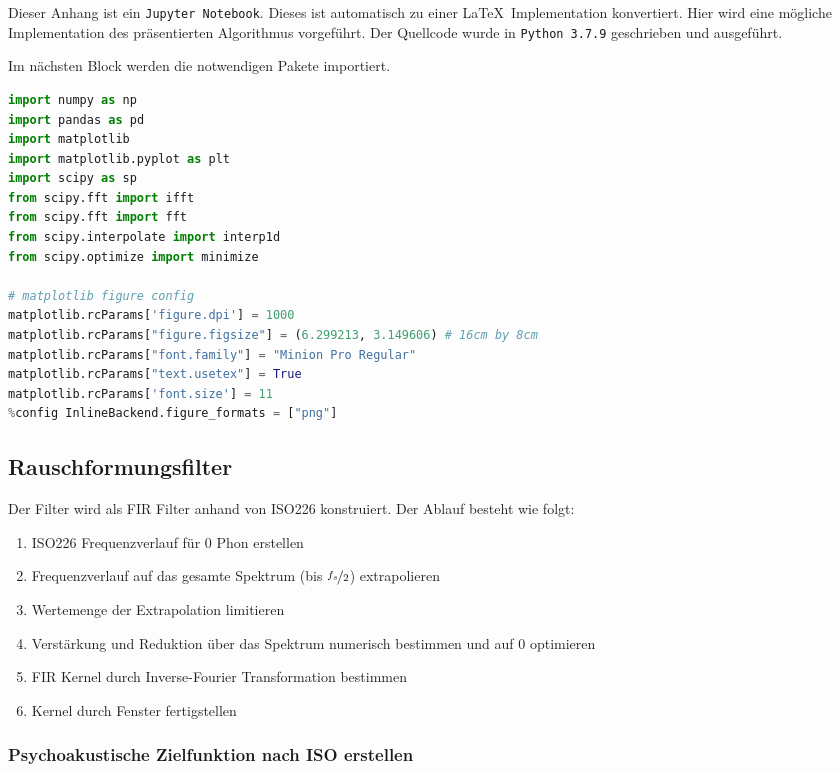 Dieser Anhang ist ein \texttt{Jupyter Notebook}. Dieses ist automatisch
zu einer \LaTeX~Implementation konvertiert. Hier wird eine mögliche
Implementation des präsentierten Algorithmus vorgeführt. Der Quellcode
wurde in \texttt{Python 3.7.9} geschrieben und ausgeführt.

Im nächsten Block werden die notwendigen Pakete importiert.

\begin{lstlisting}[language=Python]
import numpy as np
import pandas as pd
import matplotlib
import matplotlib.pyplot as plt
import scipy as sp
from scipy.fft import ifft
from scipy.fft import fft
from scipy.interpolate import interp1d
from scipy.optimize import minimize

# matplotlib figure config
matplotlib.rcParams['figure.dpi'] = 1000
matplotlib.rcParams["figure.figsize"] = (6.299213, 3.149606) # 16cm by 8cm
matplotlib.rcParams["font.family"] = "Minion Pro Regular"
matplotlib.rcParams["text.usetex"] = True
matplotlib.rcParams['font.size'] = 11
%config InlineBackend.figure_formats = ["png"]
\end{lstlisting}

\hypertarget{rauschformungsfilter}{%
\subsection{Rauschformungsfilter}\label{rauschformungsfilter}}

Der Filter wird als FIR Filter anhand von ISO226 konstruiert. Der Ablauf
besteht wie folgt:

\begin{enumerate}
\tightlist
\item
  ISO226 Frequenzverlauf für 0 Phon erstellen
\item
  Frequenzverlauf auf das gesamte Spektrum (bis \(\nicefrac{f_s}{2}\))
  extrapolieren
\item
  Wertemenge der Extrapolation limitieren
\item
  Verstärkung und Reduktion über das Spektrum numerisch bestimmen und
  auf 0 optimieren
\item
  FIR Kernel durch Inverse-Fourier Transformation bestimmen
\item
  Kernel durch Fenster fertigstellen
\end{enumerate}

\hypertarget{psychoakustische-zielfunktion-nach-iso-erstellen}{%
\subsubsection{Psychoakustische Zielfunktion nach ISO
erstellen}\label{psychoakustische-zielfunktion-nach-iso-erstellen}}

